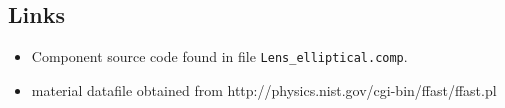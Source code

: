 \subsection*{Links}
\begin{itemize}
  \item Component source code found in file \texttt{Lens\_elliptical.comp}.
  \item material datafile obtained from http://physics.nist.gov/cgi-bin/ffast/ffast.pl
\end{itemize}
